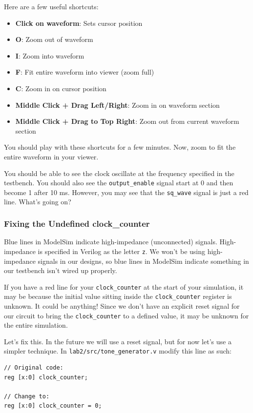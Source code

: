 \documentclass[11pt]{article}
\begin{document}
Here are a few useful shortcuts:

\begin{itemize}
	\item \textbf{Click on waveform}: Sets cursor position
	\item \textbf{O}: Zoom out of waveform
	\item \textbf{I}: Zoom into waveform
	\item \textbf{F}: Fit entire waveform into viewer (zoom full)
	\item \textbf{C}: Zoom in on cursor position
	\item \textbf{Middle Click + Drag Left/Right}: Zoom in on waveform section
	\item \textbf{Middle Click + Drag to Top Right}: Zoom out from current waveform section
\end{itemize}

You should play with these shortcuts for a few minutes. Now, zoom to fit the entire waveform in your viewer.

You should be able to see the clock oscillate at the frequency specified in the testbench. You should also see the \verb|output_enable| signal start at 0 and then become 1 after 10 ms. However, you may see that the \verb|sq_wave| signal is just a red line. What's going on?

\subsubsection{Fixing the Undefined clock\_counter}

Blue lines in ModelSim indicate high-impedance (unconnected) signals. High-impedance is specified in Verilog as the letter \verb|z|. We won't be using high-impedance signals in our designs, so blue lines in ModelSim indicate something in our testbench isn't wired up properly.

If you have a red line for your \verb|clock_counter| at the start of your simulation, it may be because the initial value sitting inside the \verb|clock_counter| register is unknown. It could be anything! Since we don't have an explicit reset signal for our circuit to bring the \verb|clock_counter| to a defined value, it may be unknown for the entire simulation.

Let's fix this. In the future we will use a reset signal, but for now let's use a simpler technique. In \verb|lab2/src/tone_generator.v| modify this line as such:

\begin{verbatim}
// Original code:
reg [x:0] clock_counter;

// Change to:
reg [x:0] clock_counter = 0;
\end{verbatim}
\end{document}
